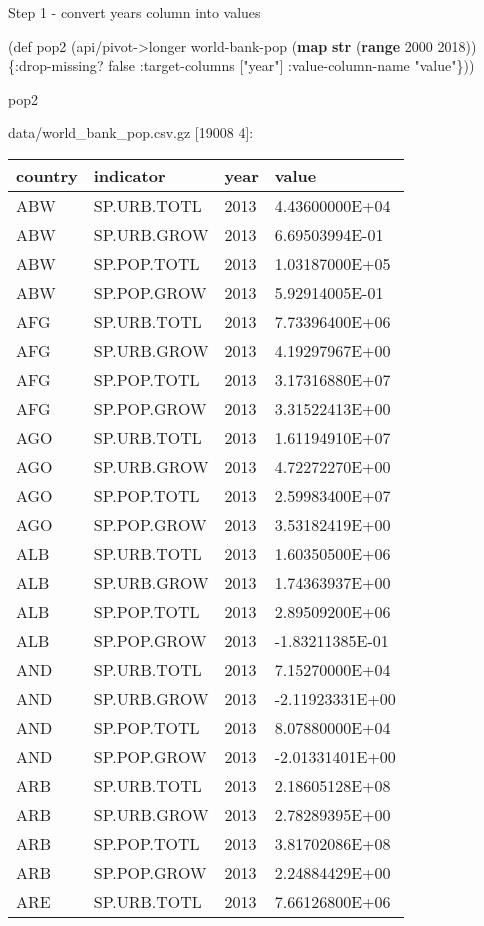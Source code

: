 \documentclass[]{article}
\newenvironment{Shaded}{\begin{snugshade}}{\end{snugshade}}
\newcommand{\AttributeTok}[1]{\textcolor[rgb]{0.77,0.63,0.00}{#1}}
\newcommand{\BuiltInTok}[1]{#1}
\newcommand{\DecValTok}[1]{\textcolor[rgb]{0.00,0.00,0.81}{#1}}
\newcommand{\FunctionTok}[1]{\textcolor[rgb]{0.00,0.00,0.00}{#1}}
\newcommand{\KeywordTok}[1]{\textcolor[rgb]{0.13,0.29,0.53}{\textbf{#1}}}
\newcommand{\NormalTok}[1]{#1}
\newcommand{\StringTok}[1]{\textcolor[rgb]{0.31,0.60,0.02}{#1}}
\newcommand{\VariableTok}[1]{\textcolor[rgb]{0.00,0.00,0.00}{#1}}
\begin{document}
Step 1 - convert years column into values

\begin{Shaded}
\begin{Highlighting}[]
\NormalTok{(}\BuiltInTok{def}\FunctionTok{ pop2 }\NormalTok{(api/pivot->longer world-bank-pop (}\KeywordTok{map} \KeywordTok{str}\NormalTok{ (}\KeywordTok{range} \DecValTok{2000} \DecValTok{2018}\NormalTok{)) \{}\AttributeTok{:drop-missing}\NormalTok{? }\VariableTok{false}
                                                                         \AttributeTok{:target-columns}\NormalTok{ [}\StringTok{"year"}\NormalTok{]}
                                                                         \AttributeTok{:value-column-name} \StringTok{"value"}\NormalTok{\}))}
\end{Highlighting}
\end{Shaded}

\begin{Shaded}
\begin{Highlighting}[]
\NormalTok{pop2}
\end{Highlighting}
\end{Shaded}

data/world\_bank\_pop.csv.gz {[}19008 4{]}:

\begin{longtable}[]{@{}llll@{}}
\toprule
country & indicator & year & value\tabularnewline
\midrule
\endhead
ABW & SP.URB.TOTL & 2013 & 4.43600000E+04\tabularnewline
ABW & SP.URB.GROW & 2013 & 6.69503994E-01\tabularnewline
ABW & SP.POP.TOTL & 2013 & 1.03187000E+05\tabularnewline
ABW & SP.POP.GROW & 2013 & 5.92914005E-01\tabularnewline
AFG & SP.URB.TOTL & 2013 & 7.73396400E+06\tabularnewline
AFG & SP.URB.GROW & 2013 & 4.19297967E+00\tabularnewline
AFG & SP.POP.TOTL & 2013 & 3.17316880E+07\tabularnewline
AFG & SP.POP.GROW & 2013 & 3.31522413E+00\tabularnewline
AGO & SP.URB.TOTL & 2013 & 1.61194910E+07\tabularnewline
AGO & SP.URB.GROW & 2013 & 4.72272270E+00\tabularnewline
AGO & SP.POP.TOTL & 2013 & 2.59983400E+07\tabularnewline
AGO & SP.POP.GROW & 2013 & 3.53182419E+00\tabularnewline
ALB & SP.URB.TOTL & 2013 & 1.60350500E+06\tabularnewline
ALB & SP.URB.GROW & 2013 & 1.74363937E+00\tabularnewline
ALB & SP.POP.TOTL & 2013 & 2.89509200E+06\tabularnewline
ALB & SP.POP.GROW & 2013 & -1.83211385E-01\tabularnewline
AND & SP.URB.TOTL & 2013 & 7.15270000E+04\tabularnewline
AND & SP.URB.GROW & 2013 & -2.11923331E+00\tabularnewline
AND & SP.POP.TOTL & 2013 & 8.07880000E+04\tabularnewline
AND & SP.POP.GROW & 2013 & -2.01331401E+00\tabularnewline
ARB & SP.URB.TOTL & 2013 & 2.18605128E+08\tabularnewline
ARB & SP.URB.GROW & 2013 & 2.78289395E+00\tabularnewline
ARB & SP.POP.TOTL & 2013 & 3.81702086E+08\tabularnewline
ARB & SP.POP.GROW & 2013 & 2.24884429E+00\tabularnewline
ARE & SP.URB.TOTL & 2013 & 7.66126800E+06\tabularnewline
\bottomrule
\end{longtable}
\end{document}

